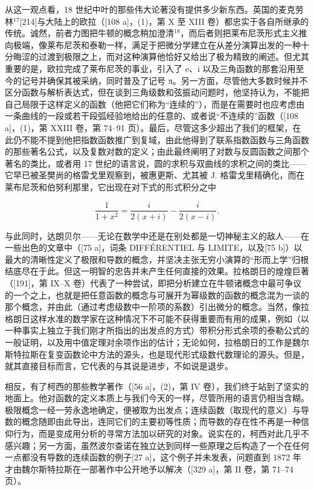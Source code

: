 从这一观点看，18 世纪中叶的那些伟大论著没有提供多少新东西。英国的麦克劳林\(^{17}\){[}214{]}与大陆上的欧拉（{[}108 a{]}，(1)，第 X 至 XIII 卷）都忠实于各自所继承的传统。诚然，前者力图把牛顿的概念稍加澄清\(^{18}\)，而后者则把莱布尼茨形式主义推向极端，像莱布尼茨和泰勒一样，满足于把微分学建立在从差分演算出发的一种十分晦涩的过渡到极限之上，而对这种演算他恰好又给出了极为精致的阐述。但尤其重要的是，欧拉完成了莱布尼茨的事业，引入了 e、i 以及三角函数的那套沿用至今的记号并确保其被采纳，同时普及了记号 π。另一方面，尽管他大多数时候并不区分函数与解析表达式，但在谈到三角级数和弦振动问题时，他坚持认为，不能把自己局限于这样定义的函数（他把它们称为“连续的”），而是在需要时也应考虑由一条曲线的一段或若干段弧经验地给出的任意的、或者说“不连续的”函数（{[}108 a{]}，(1)，第 XXIII 卷，第 74–91 页）。最后，尽管这多少超出了我们的框架，在此仍不能不提到他把指数函数推广到复域，由此他得到了联系指数函数与三角函数的那些著名公式，以及复数对数的定义；由此最终阐明了对数与反圆函数之间那个著名的类比，或者用 17 世纪的语言说，圆的求积与双曲线的求积之间的类比——它早已被圣樊尚的格雷戈里观察到，被惠更斯、尤其被 J. 格雷戈里精确化，而在莱布尼茨和伯努利那里，它出现在对下式的形式积分之中

\[
\frac {1}{1 + x ^ {2}} = \frac {i}{2 (x + i)} - \frac {i}{2 (x - i)}.
\]

与此同时，达朗贝尔——无论在数学中还是在别处都是一切神秘主义的敌人——在一些出色的文章中（{[}75 a{]}，词条 DIFFÉRENTIEL 与 LIMITE，以及{[}75 b{]}）以最大的清晰性定义了极限和导数的概念，并坚决主张无穷小演算的“形而上学”归根结底尽在于此。但这一明智的忠告并未产生任何直接的效果。拉格朗日的煌煌巨著（{[}191{]}，第 IX–X 卷）代表了一种尝试，即把分析建立在牛顿诸概念中最可争议的一个之上，也就是把任意函数的概念与可展开为幂级数的函数的概念混为一谈的那个概念，并由此（通过考虑级数中一阶项的系数）引出微分的概念。当然，像拉格朗日这样水准的数学家在这种情况下不可能不获得重要而有用的成果，例如（以一种事实上独立于我们刚才所指出的出发点的方式）带积分形式余项的泰勒公式的一般证明，以及用中值定理对余项作出的估计；无论如何，拉格朗日的工作是魏尔斯特拉斯在复变函数论中方法的源头，也是现代形式级数代数理论的源头。但是，就其直接目标而言，它代表的与其说是进步，不如说是退步。

相反，有了柯西的那些教学著作（{[}56 a{]}，(2)，第 IV 卷），我们终于站到了坚实的地面上。他对函数的定义本质上与我们今天的一样，尽管所用的语言仍相当含糊。极限概念一经一劳永逸地确定，便被取为出发点；连续函数（取现代的意义）与导数的概念随即由此导出，连同它们的主要初等性质；而导数的存在性不再是一种信仰行为，而是变成用分析的寻常方法加以研究的对象。说实在的，柯西对此几乎不感兴趣；另一方面，虽然波尔查诺在独立达到同样一些原理之后构造了一个在任何一点都没有导数的连续函数的例子{[}27 a{]}，这个例子并未发表，问题直到 1872 年才由魏尔斯特拉斯在一部著作中公开地予以解决（{[}329 a{]}，第 II 卷，第 71–74 页）。

